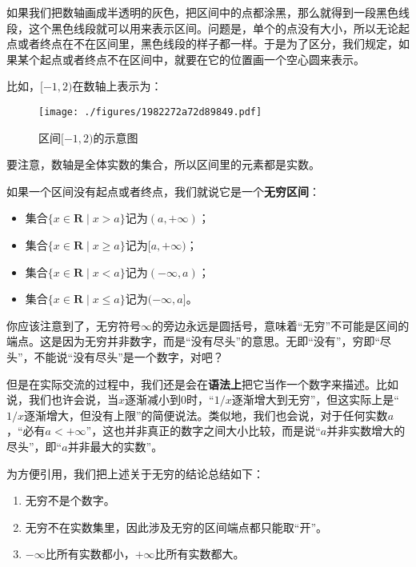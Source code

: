 

如果我们把数轴画成半透明的灰色，把区间中的点都涂黑，那么就得到一段黑色线段，这个黑色线段就可以用来表示区间。问题是，单个的点没有大小，所以无论起点或者终点在不在区间里，黑色线段的样子都一样。于是为了区分，我们规定，如果某个起点或者终点不在区间中，就要在它的位置画一个空心圆来表示。

比如，$[-1,2)$在数轴上表示为：

\begin{figure}[ht]
\centering
\texttt{[image: ./figures/1982272a72d89849.pdf]}
\caption{区间$[-1, 2)$的示意图} \label{fig_HsSet_2}
\end{figure}


要注意，数轴是全体实数的集合，所以区间里的元素都是实数。


如果一个区间没有起点或者终点，我们就说它是一个\textbf{无穷区间}：
\begin{itemize}
\item 集合$\{x\in \mathbf{R}\mid x> a\}$记为$(a, +\infty)$；
\item 集合$\{x\in \mathbf{R}\mid x\geq a\}$记为$[a, +\infty)$；
\item 集合$\{x\in \mathbf{R}\mid x< a\}$记为$(-\infty, a)$；
\item 集合$\{x\in \mathbf{R}\mid x\leq a\}$记为$(-\infty, a]$。
\end{itemize}

你应该注意到了，无穷符号$\infty$的旁边永远是圆括号，意味着“无穷”不可能是区间的端点。这是因为无穷并非数字，而是“没有尽头”的意思。无即“没有”，穷即“尽头”，不能说“没有尽头”是一个数字，对吧？

但是在实际交流的过程中，我们还是会在\textbf{语法上}把它当作一个数字来描述。比如说，我们也许会说，当$x$逐渐减小到$0$时，“$1/x$逐渐增大到无穷”，但这实际上是“$1/x$逐渐增大，但没有上限”的简便说法。类似地，我们也会说，对于任何实数$a$，“必有$a<+\infty$”，这也并非真正的数字之间大小比较，而是说“$a$并非实数增大的尽头”，即“$a$并非最大的实数”。

为方便引用，我们把上述关于无穷的结论总结如下：
\begin{enumerate}
\item 无穷不是个数字。
\item 无穷不在实数集里，因此涉及无穷的区间端点都只能取“开”。
\item $-\infty$比所有实数都小，$+\infty$比所有实数都大。
\end{enumerate}

